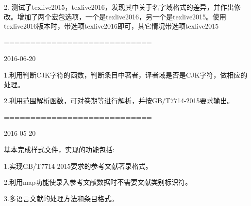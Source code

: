 2. 测试了texlive2015，texlive2016，发现其中关于名字域格式的差异，并作出修改。增加了两个宏包选项，一个是texlive2016，另一个是texlive2015。使用texlive2016版本时，带选项texlive2016即可，其它情况带选项texlive2015

============================

2016-06-20

1.利用判断CJK字符的函数，判断条目中著者，译者域是否是CJK字符，做相应的处理。

2.利用范围解析函数，可对卷期等进行解析，并按GB/T7714-2015要求输出。


============================

2016-05-20

基本完成样式文件，实现的功能包括:

1.实现GB/T7714-2015要求的参考文献著录格式。

2.利用map功能使录入参考文献数据时不需要文献类别标识符。

3.多语言文献的处理方法和条目格式。




